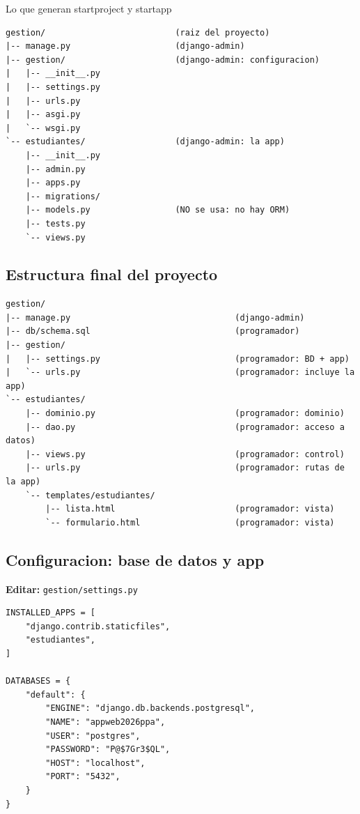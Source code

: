 \documentclass[11pt,a4paper,openany]{book}
\begin{document}
\begin{cajaejemplo}{Lo que generan startproject y startapp}
\begin{lstlisting}[style=shell,caption={Esqueleto creado por django-admin},label={lst:dj-skel}]
gestion/                          (raiz del proyecto)
|-- manage.py                     (django-admin)
|-- gestion/                      (django-admin: configuracion)
|   |-- __init__.py
|   |-- settings.py
|   |-- urls.py
|   |-- asgi.py
|   `-- wsgi.py
`-- estudiantes/                  (django-admin: la app)
    |-- __init__.py
    |-- admin.py
    |-- apps.py
    |-- migrations/
    |-- models.py                 (NO se usa: no hay ORM)
    |-- tests.py
    `-- views.py
\end{lstlisting}
\end{cajaejemplo}

\subsection{Estructura final del proyecto}
\label{ap:crud:django:estructura}

\begin{lstlisting}[style=shell,caption={Estructura completa de la pista Django},label={lst:dj-tree}]
gestion/
|-- manage.py                                 (django-admin)
|-- db/schema.sql                             (programador)
|-- gestion/
|   |-- settings.py                           (programador: BD + app)
|   `-- urls.py                               (programador: incluye la app)
`-- estudiantes/
    |-- dominio.py                            (programador: dominio)
    |-- dao.py                                (programador: acceso a datos)
    |-- views.py                              (programador: control)
    |-- urls.py                               (programador: rutas de la app)
    `-- templates/estudiantes/
        |-- lista.html                        (programador: vista)
        `-- formulario.html                   (programador: vista)
\end{lstlisting}

\subsection{Configuracion: base de datos y app}
\label{ap:crud:django:settings}

{\small\textbf{Editar:} \texttt{gestion/settings.py}}
\begin{lstlisting}[style=python,caption={settings.py (conexion PostgreSQL y registro de la app)},label={lst:dj-settings}]
INSTALLED_APPS = [
    "django.contrib.staticfiles",
    "estudiantes",
]

DATABASES = {
    "default": {
        "ENGINE": "django.db.backends.postgresql",
        "NAME": "appweb2026ppa",
        "USER": "postgres",
        "PASSWORD": "P@$7Gr3$QL",
        "HOST": "localhost",
        "PORT": "5432",
    }
}
\end{lstlisting}
\end{document}
